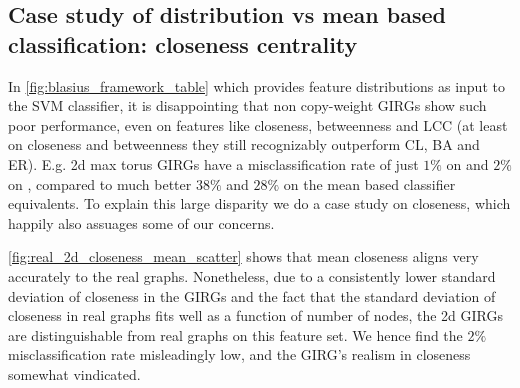 

\subsection{Case study of distribution vs mean based classification: closeness centrality}
In \cref{fig:blasius_framework_table} which provides feature distributions as input to the SVM classifier, it is disappointing that non copy-weight GIRGs show such poor performance, even on  features like closeness, betweenness and LCC (at least on closeness and betweenness they still recognizably outperform CL, BA and ER). E.g. 2d max torus GIRGs have a misclassification rate of just $1\%$ on  and $2\%$ on , compared to much better $38\%$ and $28\%$ on the mean based classifier equivalents. To explain this large disparity we do a case study on closeness, which happily also assuages some of our concerns.

\cref{fig:real_2d_closeness_mean_scatter} shows that mean closeness aligns very accurately to the real graphs. Nonetheless, due to a consistently lower standard deviation of closeness in the GIRGs and the fact that the standard deviation of closeness in real graphs fits well as a function of number of nodes, the 2d GIRGs are distinguishable from real graphs on this feature set. We hence find the $2\%$ misclassification rate misleadingly low, and the GIRG's realism in closeness somewhat vindicated.


